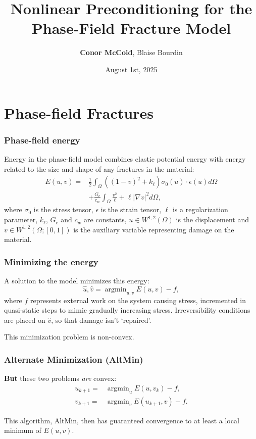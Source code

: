 \documentclass{beamer}
\title{Nonlinear Preconditioning for the Phase-Field Fracture Model}
\author{\textbf{Conor McCoid}, Blaise Bourdin}
\institute{McMaster University}
\date{August 1st, 2025}
\DeclareMathOperator*{\argmin}{argmin}
\begin{document}
\maketitle

\section{Phase-field Fractures}

\begin{frame}
\frametitle{Phase-field energy}

Energy in the phase-field model combines elastic potential energy with energy related to the size and shape of any fractures in the material:
\begin{align*}
E(u,v) = & \frac{1}{2} \int_\Omega \left ( (1-v)^2 + k_\ell \right ) \sigma_0(u) \cdot \epsilon(u) d\Omega \\
		& + \frac{G_c}{c_w} \int_\Omega \frac{v^2}{\ell} + \ell \lvert \nabla v \rvert^2 d\Omega,
\end{align*}
where $\sigma_0$ is the stress tensor, $\epsilon$ is the strain tensor, $\ell$ is a regularization parameter, $k_\ell$, $G_c$ and $c_w$ are constants, $u \in W^{1,2}(\Omega)$ is the displacement and $v \in W^{1,2}(\Omega; [0,1])$ is the auxiliary variable representing damage on the material.

\end{frame}

\begin{frame}
\frametitle{Minimizing the energy}

A solution to the model minimizes this energy:
\begin{equation*}
\hat{u}, \hat{v} = \argmin_{u,v} E(u,v) - f,
\end{equation*}
where $f$ represents external work on the system causing stress, incremented in quasi-static steps to mimic gradually increasing stress.
Irreversibility conditions are placed on $\hat{v}$, so that damage isn't `repaired'.

This minimization problem is non-convex.

\end{frame}

\begin{frame}
\frametitle{Alternate Minimization (AltMin)}

\textbf{But} these two problems \textit{are} convex:
\begin{align*}
	u_{k+1} = & \argmin_u E(u, v_k) - f, \\ v_{k+1} = & \argmin_v E(u_{k+1}, v) - f.
\end{align*}

This algorithm, AltMin, then has guaranteed convergence to at least a local minimum of $E(u,v)$.

\end{frame}
\end{document}
